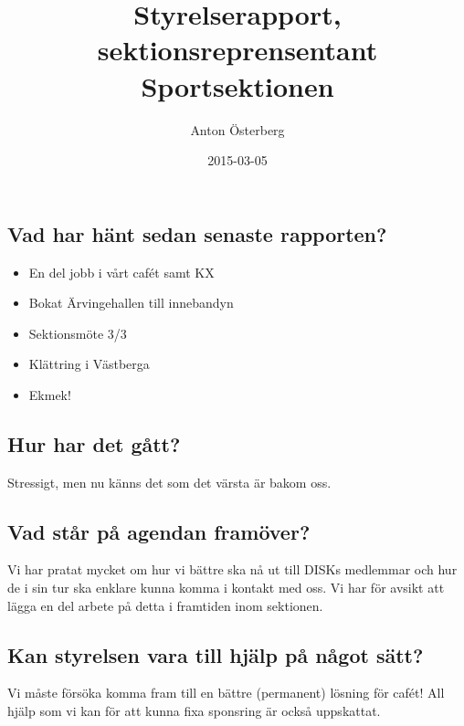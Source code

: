 \documentclass[a4paper]{article}
\begin{document}
	\title{\Huge Styrelserapport, sektionsreprensentant Sportsektionen}
	\author{Anton Österberg}
	\date{2015-03-05}
	\maketitle

	\null
	\vfill

	\clearpage

	\subsection{Vad har hänt sedan senaste rapporten?}
	\begin{itemize}
		\item En del jobb i vårt cafét samt KX
		\item Bokat Ärvingehallen till innebandyn
		\item Sektionsmöte 3/3
		\item Klättring i Västberga
		\item Ekmek!
	\end{itemize}
	\subsection{Hur har det gått?}
	Stressigt, men nu känns det som det värsta är bakom oss.
	\subsection{Vad står på agendan framöver?}
	Vi har pratat mycket om hur vi bättre ska nå ut till DISKs medlemmar och hur de i sin tur ska enklare kunna komma i kontakt med oss. Vi har för avsikt att lägga en del arbete på detta i framtiden inom sektionen.

	\subsection{Kan styrelsen vara till hjälp på något sätt?}
	Vi måste försöka komma fram till en bättre (permanent) lösning för cafét! All hjälp som vi kan för att kunna fixa sponsring är också uppskattat.
\end{document}
